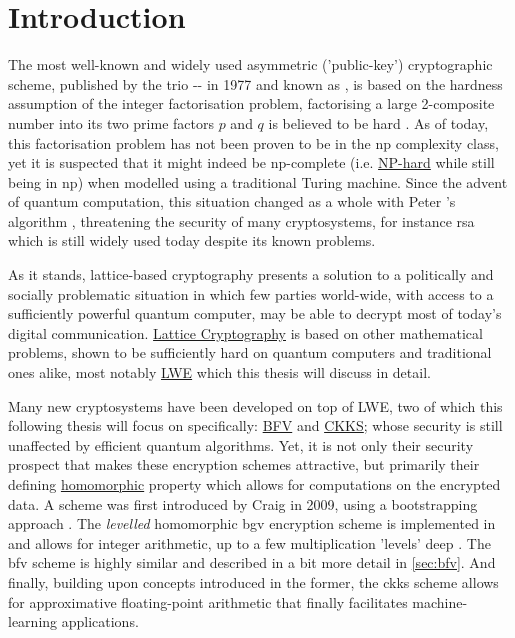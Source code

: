 \chapter{Introduction}
\label{chap:introduction}
The most well-known and widely used asymmetric ('public-key') cryptographic scheme, published by the trio -- in 1977 and known as , is based on the hardness assumption of the integer factorisation problem, factorising a large 2-composite number into its two prime factors $p$ and $q$ is believed to be hard \parencite{1983-rsa}.
As of today, this factorisation problem has not been proven to be in the \gls{np} complexity class, yet it is suspected that it might indeed be \gls{np}-complete (i.e. \hyperref[def:np-hard]{NP-hard} while still being in \gls{np}) when modelled using a traditional Turing machine.
Since the advent of quantum computation, this situation changed as a whole with Peter 's algorithm \parencite{1997-shors-algorithm}, threatening the security of many cryptosystems, for instance \gls{rsa} which is still widely used today despite its known problems.

As it stands, lattice-based cryptography presents a solution to a politically and socially problematic situation in which few parties world-wide, with access to a sufficiently powerful quantum computer, may be able to decrypt most of today's digital communication.
\hyperref[subsec:lattice-crypto]{Lattice Cryptography} is based on other mathematical problems, shown to be sufficiently hard on quantum computers and traditional ones alike, most notably \hyperref[def:lwe-search-problem]{LWE} \parencite{2005-lwe-original} which this thesis will discuss in detail.

Many new cryptosystems have been developed on top of LWE, two of which this following thesis will focus on specifically: \hyperref[def:bfv-scheme]{BFV} and \hyperref[def:ckks-scheme]{CKKS};
whose security is still unaffected by efficient quantum algorithms.
Yet, it is not only their security prospect that makes these encryption schemes attractive, but primarily their defining \hyperref[def:ring-homomorphism]{homomorphic} property which allows for computations on the encrypted data.
A  scheme was first introduced by Craig  in 2009, using a bootstrapping approach \parencite{2009-gentry-fhe-original}.
The \textit{levelled} homomorphic \gls{bgv} encryption scheme is implemented in \cite{seal-4.0} and allows for integer arithmetic, up to a few multiplication 'levels' deep \parencite{2012-bgv-original}.
The \gls{bfv} scheme \parencite{2012-fv-original,2012-brakerski} is highly similar and described in a bit more detail in \cref{sec:bfv}.
And finally, building upon concepts introduced in the former, the \gls{ckks} scheme \parencite{2017-ckks-original} allows for approximative floating-point arithmetic that finally facilitates machine-learning applications.

